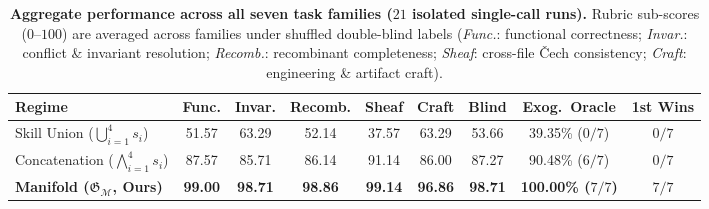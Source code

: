 \documentclass[11pt]{article}
\theoremstyle{definition}
\theoremstyle{plain}
\newcommand{\Mcal}{\mathcal{M}}
\newcommand{\Gfrak}{\mathfrak{G}}
\begin{document}
\begin{table}[t]
\centering
\caption{\textbf{Aggregate performance across all seven task families ($21$ isolated single-call runs).} Rubric sub-scores ($0$--$100$) are averaged across families under shuffled double-blind labels (\emph{Func.}: functional correctness; \emph{Invar.}: conflict \& invariant resolution; \emph{Recomb.}: recombinant completeness; \emph{Sheaf}: cross-file \v{C}ech consistency; \emph{Craft}: engineering \& artifact craft).}
\label{tab:aggregate}
\vspace{4pt}
\footnotesize
\setlength{\tabcolsep}{0pt}
\begin{tabular*}{\textwidth}{@{\extracolsep{\fill}}lcccccccc@{}}
\toprule
\textbf{Regime} & \textbf{Func.} & \textbf{Invar.} & \textbf{Recomb.} & \textbf{Sheaf} & \textbf{Craft} & \textbf{Blind} & \textbf{Exog.\ Oracle} & \textbf{1st Wins} \\
\midrule
Skill Union ($\bigcup_{i=1}^4 s_i$)        & 51.57 & 63.29 & 52.14 & 37.57 & 63.29 & 53.66 & 39.35\% ($0/7$) & $0/7$ \\
Concatenation ($\bigwedge_{i=1}^4 s_i$)    & 87.57 & 85.71 & 86.14 & 91.14 & 86.00 & 87.27 & 90.48\% ($6/7$) & $0/7$ \\
\textbf{Manifold ($\Gfrak_{\Mcal}$, Ours)} & \textbf{99.00} & \textbf{98.71} & \textbf{98.86} & \textbf{99.14} & \textbf{96.86} & \textbf{98.71} & \textbf{100.00\% ($7/7$)} & \textbf{$7/7$} \\
\bottomrule
\end{tabular*}
\end{table}
\end{document}

